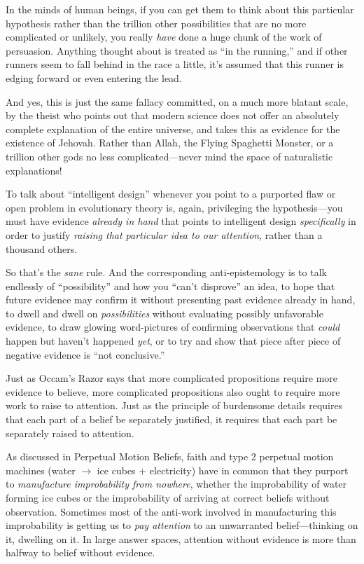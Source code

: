 {
 In the minds of human beings, if you can get them to think about
this particular hypothesis rather than the trillion other possibilities
that are no more complicated or unlikely, you really \textit{have} done
a huge chunk of the work of persuasion. Anything thought about is
treated as ``in the running,'' and
if other runners seem to fall behind in the race a little,
it's assumed that this runner is edging forward or even
entering the lead.}

{
 And yes, this is just the same fallacy committed, on a much more
blatant scale, by the theist who points out that modern science does
not offer an absolutely complete explanation of the entire universe,
and takes this as evidence for the existence of Jehovah. Rather than
Allah, the Flying Spaghetti Monster, or a trillion other gods no less
complicated---never mind the space of naturalistic explanations!}

{
 To talk about ``intelligent
design'' whenever you point to a purported flaw or
open problem in evolutionary theory is, again, privileging the
hypothesis---you must have evidence \textit{already in hand} that
points to intelligent design \textit{specifically} in order to justify
\textit{raising that particular idea to our attention}, rather than a
thousand others.}

{
 So that's the \textit{sane} rule. And the
corresponding anti-epistemology is to talk endlessly of
``possibility'' and how you
``can't disprove''
an idea, to hope that future evidence may confirm it without presenting
past evidence already in hand, to dwell and dwell on
\textit{possibilities} without evaluating possibly unfavorable
evidence, to draw glowing word-pictures of confirming observations that
\textit{could} happen but haven't happened
\textit{yet}, or to try and show that piece after piece of negative
evidence is ``not conclusive.''}

{
 Just as Occam's Razor says that more complicated
propositions require more evidence to believe, more complicated
propositions also ought to require more work to raise to attention.
Just as the principle of burdensome details requires that each part of
a belief be separately justified, it requires that each part be
separately raised to attention.}

{
 As discussed in Perpetual Motion Beliefs, faith and type 2
perpetual motion machines (water $\rightarrow $ ice cubes +
electricity) have in common that they purport to \textit{manufacture
improbability from nowhere}, whether the improbability of water forming
ice cubes or the improbability of arriving at correct beliefs without
observation. Sometimes most of the anti-work involved in manufacturing
this improbability is getting us to \textit{pay attention} to an
unwarranted belief---thinking on it, dwelling on it. In large answer
spaces, attention without evidence is more than halfway to belief
without evidence.}

